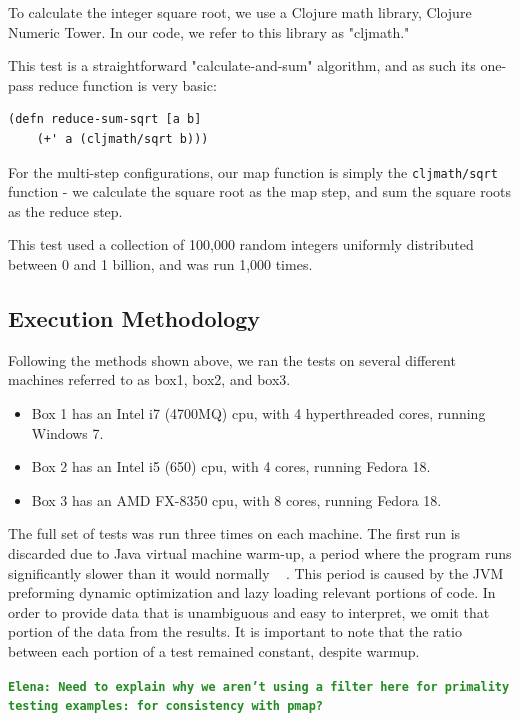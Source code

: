 \documentclass[12pt]{article}
\newcommand{\comment}[1]{{\bf \tt  {#1}}}
\newcommand{\emcomment}[1]{\textcolor{ForestGreen}{\comment{Elena: {#1}}}}
\begin{document}
To calculate the integer square root, we use a Clojure math library, Clojure Numeric Tower. In our code, we refer to this library as "cljmath."

This test is a straightforward "calculate-and-sum" algorithm, and as such its one-pass reduce function is very basic:

\begin{verbatim}
(defn reduce-sum-sqrt [a b] 
    (+' a (cljmath/sqrt b)))
\end{verbatim}

For the multi-step configurations, our map function is simply the \texttt{cljmath/sqrt} function - we calculate the square root as the map step, and sum the square roots as the reduce step.
 
This test used a collection of 100,000 random integers uniformly distributed between 0 and 1 billion, and was run 1,000 times.
 
 \subsection{Execution Methodology}\label{sec:eMethods}
 Following the methods shown above, we ran the tests on several different machines referred to as box1, box2, and box3.
 
\begin{itemize}
 \item 
 Box 1 has an Intel i7 (4700MQ) cpu, with 4 hyperthreaded cores, running Windows 7.
 \item
 Box 2 has an Intel i5 (650) cpu, with 4 cores, running Fedora 18.
 \item
 Box 3 has an AMD FX-8350 cpu, with 8 cores, running Fedora 18. 
 \end{itemize}
  
The full set of tests was run three times on each machine. The first run is discarded due to Java virtual machine warm-up, a period where the program runs significantly slower than it would normally ~\cite{Blackburn:2008} . This period is caused by the JVM preforming dynamic optimization and lazy loading relevant portions of code. In order to provide data that is unambiguous and easy to interpret, we omit that portion of the data from the results. It is important to note that the ratio between each portion of a test remained constant, despite warmup.

\emcomment{Need to explain why we aren't using a filter here for primality testing examples: for consistency with pmap?}
\end{document}
